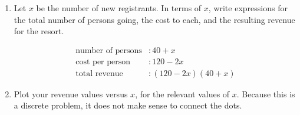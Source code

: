 \documentclass[12pt]{article}
\begin{document}
\begin{enumerate}

\item 
Let $x$ be the number of new registrants. In terms of $x$, write expressions for the total number of persons going, the cost to each, and the resulting revenue for the resort.

\begin{answer}
\begin{align*}
\text{number of persons} &: 40 + x\\
\text{cost per person} &: 120 - 2x\\
\text{total revenue} &: (120 - 2x) (40 + x)
\end{align*}
\end{answer}

\item 
Plot your revenue values versus $x$, for the relevant values of $x$. Because this is a discrete problem, it does not make sense to connect the dots. 


\end{enumerate}
\end{document}
